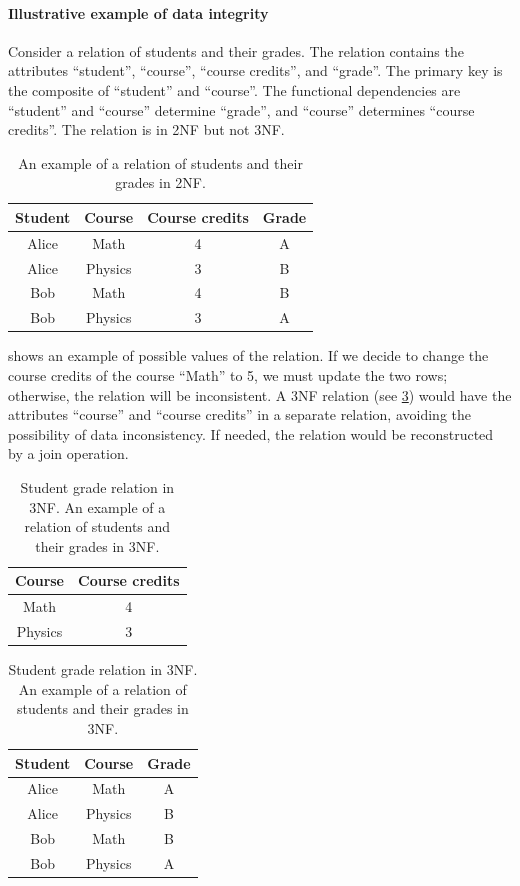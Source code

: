 \paragraph{Illustrative example of data integrity}  Consider a relation of students and
their grades.  The relation contains the attributes ``student'', ``course'', ``course
credits'', and ``grade''.  The primary key is the composite of ``student'' and ``course''.
The functional dependencies are ``student'' and ``course'' determine ``grade'', and
``course'' determines ``course credits''.  The relation is in 2NF but not 3NF.

\begin{table}
  \centering
  \begin{tabular}{cccc}
    \toprule
    \textbf{Student} & \textbf{Course} & \textbf{Course credits} & \textbf{Grade} \\
    \midrule
    Alice & Math & 4 & A \\
    Alice & Physics & 3 & B \\
    Bob & Math & 4 & B \\
    Bob & Physics & 3 & A \\
    \bottomrule
  \end{tabular}
  \caption{
  An example of a relation of students and their grades in 2NF.
  }
  \label{tab:student-grade-illustration}
\end{table}

 shows an example of possible values of the relation.
If we decide to change the course credits of the course ``Math'' to 5, we must update the
two rows; otherwise, the relation will be inconsistent.  A 3NF relation (see
\cref{tab:student-grade-illustration2}) would have the attributes ``course'' and ``course
credits'' in a separate relation, avoiding the possibility of data inconsistency.  If
needed, the relation would be reconstructed by a join operation.

\begin{table}
  \centering
  \begin{tabular}{cc}
    \toprule
    \textbf{Course} & \textbf{Course credits} \\
    \midrule
    Math & 4 \\
    Physics & 3 \\
    \bottomrule
  \end{tabular}
  \quad
  \begin{tabular}{ccc}
    \toprule
    \textbf{Student} & \textbf{Course} & \textbf{Grade} \\
    \midrule
    Alice & Math & A \\
    Alice & Physics & B \\
    Bob & Math & B \\
    Bob & Physics & A \\
    \bottomrule
  \end{tabular}
  \caption{
  Student grade relation in 3NF.
  An example of a relation of students and their grades in 3NF.
  }
  \label{tab:student-grade-illustration2}
\end{table}

